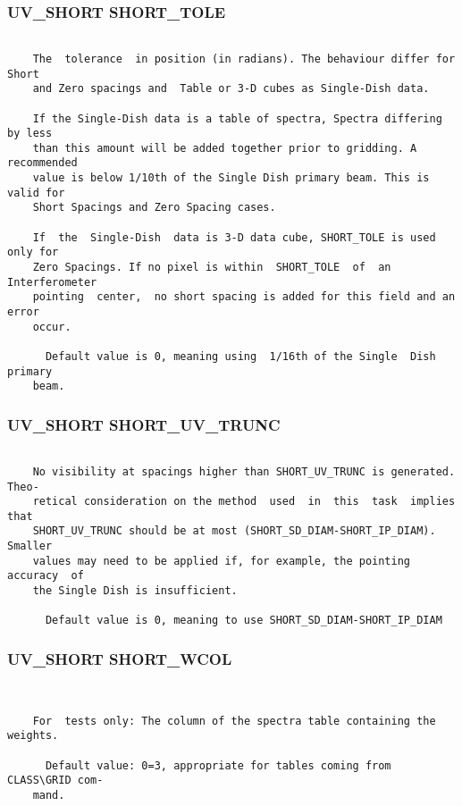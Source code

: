 \subsubsection{UV\_SHORT SHORT\_TOLE}
\begin{verbatim}

    The  tolerance  in position (in radians). The behaviour differ for Short
    and Zero spacings and  Table or 3-D cubes as Single-Dish data.

    If the Single-Dish data is a table of spectra, Spectra differing by less
    than this amount will be added together prior to gridding. A recommended
    value is below 1/10th of the Single Dish primary beam. This is valid for
    Short Spacings and Zero Spacing cases.

    If  the  Single-Dish  data is 3-D data cube, SHORT_TOLE is used only for
    Zero Spacings. If no pixel is within  SHORT_TOLE  of  an  Interferometer
    pointing  center,  no short spacing is added for this field and an error
    occur.

      Default value is 0, meaning using  1/16th of the Single  Dish  primary
    beam.

\end{verbatim}
\subsubsection{UV\_SHORT SHORT\_UV\_TRUNC}
\begin{verbatim}

    No visibility at spacings higher than SHORT_UV_TRUNC is generated. Theo-
    retical consideration on the method  used  in  this  task  implies  that
    SHORT_UV_TRUNC should be at most (SHORT_SD_DIAM-SHORT_IP_DIAM).  Smaller
    values may need to be applied if, for example, the pointing accuracy  of
    the Single Dish is insufficient.

      Default value is 0, meaning to use SHORT_SD_DIAM-SHORT_IP_DIAM

\end{verbatim}
\subsubsection{UV\_SHORT SHORT\_WCOL}
\begin{verbatim}


    For  tests only: The column of the spectra table containing the weights.

      Default value: 0=3, appropriate for tables coming from CLASS\GRID com-
    mand.

\end{verbatim}
